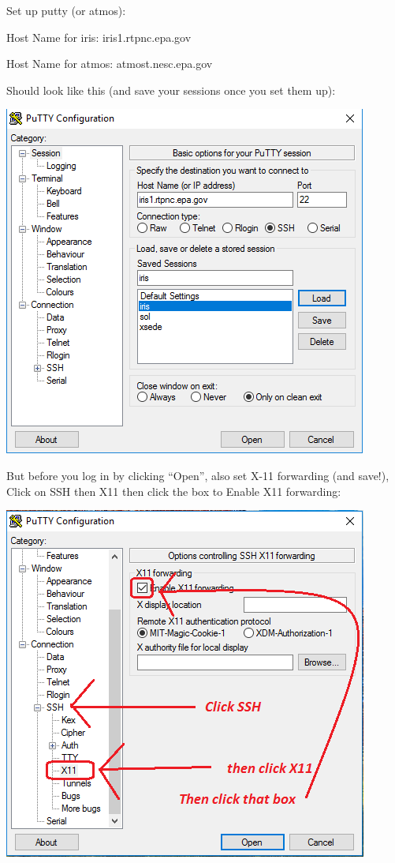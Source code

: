 \documentclass[12pt,letterpaper]{memoir} %
\begin{document}
Set up putty (or atmos):

Host Name for iris: iris1.rtpnc.epa.gov

Host Name for atmos: atmost.nesc.epa.gov

Should look like this (and save your sessions once you set them up):
\begin{center}
\includegraphics{Figures/App1/Env/putty_basic.PNG}
\end{center}

But before you log in by clicking “Open”, also set X-11 forwarding (and save!), Click on SSH then X11 then click the box to Enable X11 forwarding:
\begin{center}
\includegraphics{Figures/App1/Env/X11.PNG}
\end{center}
\end{document}
